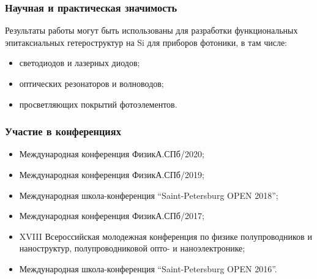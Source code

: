 \begin{frame}
    \frametitle{Научная и практическая значимость}
Результаты работы могут быть использованы для разработки функциональных эпитаксиальных гетероструктур на Si для приборов фотоники, в там числе:
    \begin{itemize}
	\item светодиодов и лазерных диодов;
	\item оптических резонаторов и волноводов;
	\item просветляющих покрытий фотоэлементов.
    \end{itemize}
\end{frame}
%
%

\begin{frame}
	\frametitle{Участие в конференциях}
	\begin{itemize}
		\item Международная конференция ФизикА.СПб/2020;
		\item Международная конференция ФизикА.СПб/2019;
		\item Международная школа-конференция “Saint-Petersburg OPEN 2018”;
		\item Международная конференция ФизикА.СПб/2017;
		\item XVIII Всероссийская молодежная конференция по физике полупроводников и наноструктур, полупроводниковой опто- и наноэлектронике;
		\item Международная школа-конференция “Saint-Petersburg OPEN 2016”.
	\end{itemize}
\end{frame}

